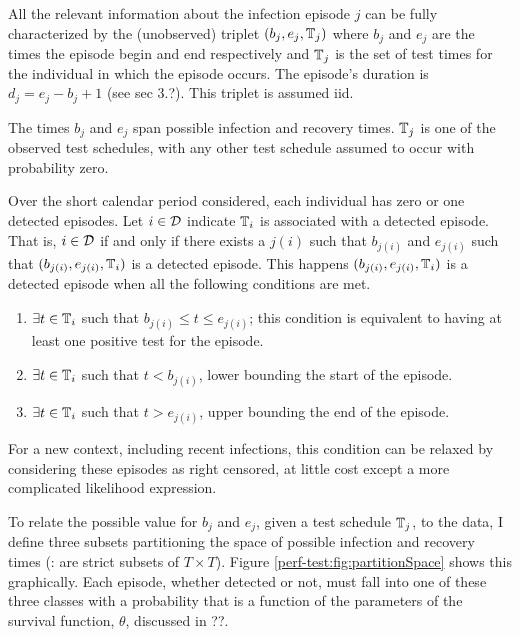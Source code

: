 \documentclass[thesis.tex]{subfiles}
\begin{document}
All the relevant information about the infection episode $j$ can be fully characterized by the (unobserved) triplet $(b_j, e_j, \mathbb{T}_j)$ where $b_j$ and $e_j$ are the times the episode begin and end respectively and $\mathbb{T}_j$ is the set of test times for the individual in which the episode occurs.
The episode's duration is $d_j = e_j - b_j + 1$ (see sec 3.?).
This triplet is assumed iid.


The times $b_j$ and $e_j$ span possible infection and recovery times.
$\mathbb{T}_j$ is one of the observed test schedules, with any other test schedule assumed to occur with probability zero.

Over the short calendar period considered, each individual has zero or one detected episodes.
Let $i \in \mathcal{D}$ indicate $\mathbb{T}_i$ is associated with a detected episode.
That is, $i \in \mathcal{D}$ if and only if there exists a $j(i)$ such that $b_{j(i)}$ and $e_{j(i)}$ such that $(b_{j(i)}, e_{j(i)}, \mathbb{T}_i)$ is a detected episode. 
This happens
$(b_{j(i)}, e_{j(i)}, \mathbb{T}_i)$ is a detected episode when all the following conditions are met.
\begin{enumerate}
    \item $\exists t \in \mathbb{T}_i$ such that $b_{j(i)} \leq t \leq e_{j(i)}$; this condition is equivalent to having at least one positive test for the episode.
    \item $\exists t \in \mathbb{T}_i$ such that $t < b_{j(i)}$, lower bounding the start of the episode.
    \item $\exists t \in \mathbb{T}_i$ such that $t > e_{j(i)}$, upper bounding the end of the episode.
\end{enumerate}
For a new context, including recent infections, this condition can be relaxed by considering these episodes as right censored, at little cost except a more complicated likelihood expression.

To relate the possible value for $b_j$ and $e_j$, given a test schedule $\mathbb{T}_j$, to the data, I define three subsets partitioning the space of possible infection and recovery times (\ie: are strict subsets of $T \times T$).
Figure \ref{perf-test:fig:partitionSpace} shows this graphically.
Each episode, whether detected or not, must fall into one of these three classes with a probability that is a function of the parameters of the survival function, $\theta$, discussed in ??.
\end{document}
